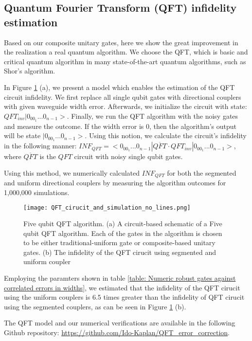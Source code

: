 \documentclass[floatfix,reprint, amsmath,amssymb,aps,superscriptaddress,nofootinbib]{revtex4-2}
\begin{document}
\subsection{Quantum Fourier Transform (QFT) infidelity estimation }

Based on our composite unitary gates, here we show the great improvement in the realization a real quantum algorithm. We choose the QFT, which is basic and critical quantum algorithm in many state-of-the-art quantum algorithms, such as Shor's algorithm. 

In Figure \ref{fig: QFT circuit} (a), we present a model which enables the estimation of the QFT circuit infidelity. We first replace all single qubit gates with directional couplers with given waveguide width error. Afterwards, we initialize the circuit with state: $QFT_{inv}|0_00_1...0_{n-1}>$. Finally, we run the QFT algorithm with the noisy gates and measure the outcome. If the width error is 0, then the algorithm's output will be state $|0_00_1...0_{n-1}>$.
Using this notion, we calculate the circuit's  infidelity in the following manner:
$INF_{QFT}=<0_00_1...0_{n-1}| \overline{QFT} \cdot QFT_{inv}|0_00_1...0_{n-1}>$, where $\overline{QFT}$ is the $QFT$ circuit with noisy single qubit gates.

Using this method, we numerically calculated $INF_{QFT}$ for both the segmented and uniform directional couplers by measuring the algorithm outcomes for 1,000,000 simulations. 

\begin{figure}[!h]
     \centering
     \texttt{[image: QFT\_cirucit\_and\_simulation\_no\_lines.png]}
     \caption{Five qubit QFT algorithm. (a) A circuit-based schematic of a Five qubit QFT algorithm. Each of the gates in the algorithm is chosen to be either traditional-uniform gate or composite-based unitary gates. (b) The infidelity of the QFT cirucit using segmented and uniform coupler}
     \label{fig: QFT circuit}
\end{figure}


Employing the paramters shown in table \ref{table: Numeric robust gates against correlated errors in widths}, we estimated that the infidelity of the QFT cirucit using the uniform couplers is 6.5 times greater than the infidelity of QFT cirucit using the segmented couplers, as can be seen in Figure \ref{fig: QFT circuit} (b).

The QFT model and our numerical verifications are available in the following Github repository:
\url{https://github.com/Ido-Kaplan/QFT_error_correction}.
\end{document}
